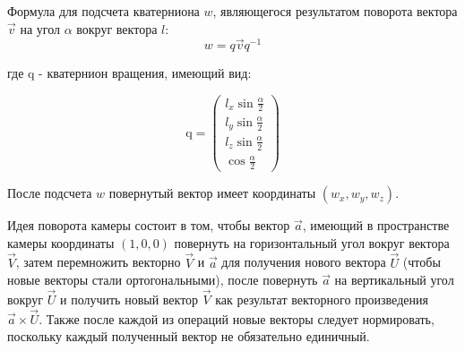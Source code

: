   Формула для подсчета кватерниона \begin{math}w\end{math}, являющегося результатом поворота вектора \begin{math}\vec{v}\end{math} 
  на угол \begin{math}\alpha\end{math} вокруг вектора \begin{math}l\end{math}:
  \begin{equation}w = q\vec{v}q^{-1}\end{equation}\begin{eqrem}где q - кватернион вращения, имеющий вид:
  
  \begin{equation}
  \mathrm{q} = 
    \begin{pmatrix}
    l_x \sin{\frac{\alpha}{2}}\\
    l_y\sin{\frac{\alpha}{2}}\\
    l_z\sin{\frac{\alpha}{2}}\\
    \cos{\frac{\alpha}{2}}
  \end{pmatrix}
  \end{equation}\end{eqrem}  

    После подсчета \begin{math}w\end{math} повернутый вектор имеет координаты \begin{math}(w_x,w_y,w_z)\end{math}.

    Идея поворота камеры состоит в том, чтобы вектор \begin{math}\vec{a}\end{math}, имеющий в пространстве
    камеры координаты \begin{math}(1, 0, 0)\end{math} повернуть на горизонтальный угол вокруг вектора \begin{math}\vec{V}\end{math}, затем перемножить 
    векторно \begin{math}\vec{V}\end{math} и \begin{math}\vec{a}\end{math} для получения нового вектора \begin{math}\vec{U}\end{math} (чтобы новые векторы 
    стали ортогональными), после повернуть \begin{math}\vec{a}\end{math} на вертикальный угол вокруг \begin{math}\vec{U}\end{math} и получить новый вектор
    \begin{math}\vec{V}\end{math} как результат векторного произведения \begin{math}\vec{a} \times \vec{U}\end{math}. Также после каждой из операций новые 
    векторы следует нормировать, поскольку каждый полученный вектор не обязательно единичный.

